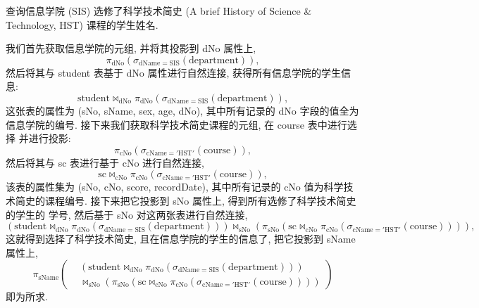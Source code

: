 \documentclass[10pt,UTF8]{book} %
\begin{document}
\begin{example}
    查询信息学院 (SIS) 选修了科学技术简史 (A brief History of Science
    \& Technology, HST) 课程的学生姓名.
    \begin{sol}
        我们首先获取信息学院的元组, 并将其投影到 dNo 属性上,
        \[ \pi_\mathrm{dNo} \left(
            \sigma_{\mathrm{dName}=\mathrm{SIS}}(\mathrm{department})
        \right), \]
        然后将其与 student 表基于 dNo 属性进行自然连接,
        获得所有信息学院的学生信息:
        \[ \mathrm{student} \Join_\mathrm{dNo} \pi_\mathrm{dNo} \left(
            \sigma_{\mathrm{dName}=\mathrm{SIS}}(\mathrm{department})
        \right), \]
        这张表的属性为 (sNo, sName, sex, age, dNo),
        其中所有记录的 dNo 字段的值全为信息学院的编号.
        接下来我们获取科学技术简史课程的元组, 在 course 表中进行选择
        并进行投影:
        \[ \pi_\mathrm{cNo} \left(
            \sigma_\mathrm{cName = 'HST'}(\mathrm{course})
        \right), \]
        然后将其与 sc 表进行基于 cNo 进行自然连接,
        \[ \mathrm{sc} \Join_\mathrm{cNo}
        \pi_\mathrm{cNo} \left(
            \sigma_\mathrm{cName = 'HST'}(\mathrm{course})
        \right), \]
        该表的属性集为 (sNo, cNo, score, recordDate),
        其中所有记录的 cNo 值为科学技术简史的课程编号.
        接下来把它投影到 sNo 属性上, 得到所有选修了科学技术简史的学生的
        学号, 然后基于 sNo 对这两张表进行自然连接,
        \[ \left(\mathrm{student} \Join_\mathrm{dNo} \pi_\mathrm{dNo} \left(
            \sigma_{\mathrm{dName}=\mathrm{SIS}}(\mathrm{department})
        \right)\right) \Join_\mathrm{sNo} \left( \pi_\mathrm{sNo} \left(
            \mathrm{sc} 
            \Join_\mathrm{cNo}
            \pi_\mathrm{cNo} \left(
                \sigma_\mathrm{cName = 'HST'}(\mathrm{course})
            \right)
        \right)\right), \]
        这就得到选择了科学技术简史, 且在信息学院的学生的信息了, 把它投影到
        sName 属性上, 
        \[ \pi_\mathrm{sName} \left(
        \begin{matrix}
                & \left(\mathrm{student} \Join_\mathrm{dNo} \pi_\mathrm{dNo} \left(
                \sigma_{\mathrm{dName}=\mathrm{SIS}}(\mathrm{department})
            \right)\right) \\ 
            & \Join_\mathrm{sNo} \left( \pi_\mathrm{sNo} \left(
                \mathrm{sc} 
                \Join_\mathrm{cNo}
                \pi_\mathrm{cNo} \left(
                    \sigma_\mathrm{cName = 'HST'}(\mathrm{course})
                \right)
            \right)\right)
        \end{matrix}\right) \]
        即为所求.
    \end{sol}
\end{example}
\end{document}
